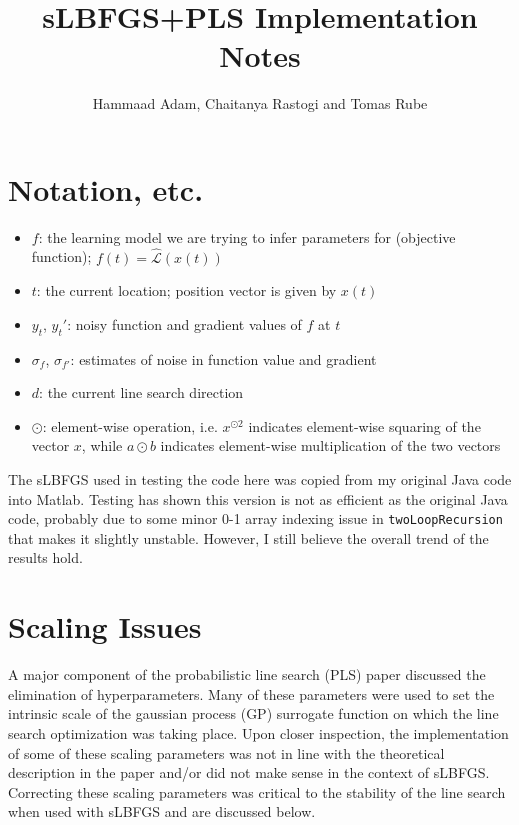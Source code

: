 \documentclass{article}
\begin{document}
\title{sLBFGS+PLS Implementation Notes}
\author{Hammaad Adam, Chaitanya Rastogi and Tomas Rube}
\maketitle

\section{Notation, etc.}
\begin{itemize}
	\item $f$: the learning model we are trying to infer parameters for (objective function); $f(t) = \hat{\mathcal{L}}(x(t))$ 
	\item $t$: the current location; position vector is given by $x(t)$
	\item $y_t$, $y_t'$: noisy function and gradient values of $f$ at $t$
	\item $\sigma_f$, $\sigma_{f'}$: estimates of noise in function value and gradient
	\item $d$: the current line search direction
	\item $\odot$: element-wise operation, i.e. $x^{\odot 2}$ indicates element-wise squaring of the vector $x$, while $a\odot b$ indicates element-wise multiplication of the two vectors
\end{itemize}
The sLBFGS used in testing the code here was copied from my original Java code into Matlab. Testing has shown this version is not as efficient as the original Java code, probably due to some minor 0-1 array indexing issue in \texttt{twoLoopRecursion} that makes it slightly unstable. However, I still believe the overall trend of the results hold. 
\section{Scaling Issues}
A major component of the probabilistic line search (PLS) paper discussed the elimination of hyperparameters. Many of these parameters were used to set the intrinsic scale of the gaussian process (GP) surrogate function on which the line search optimization was taking place. Upon closer inspection, the implementation of some of these scaling parameters was not in line with the theoretical description in the paper and/or did not make sense in the context of sLBFGS. Correcting these scaling parameters was critical to the stability of the line search when used with sLBFGS and are discussed below.
\end{document}
